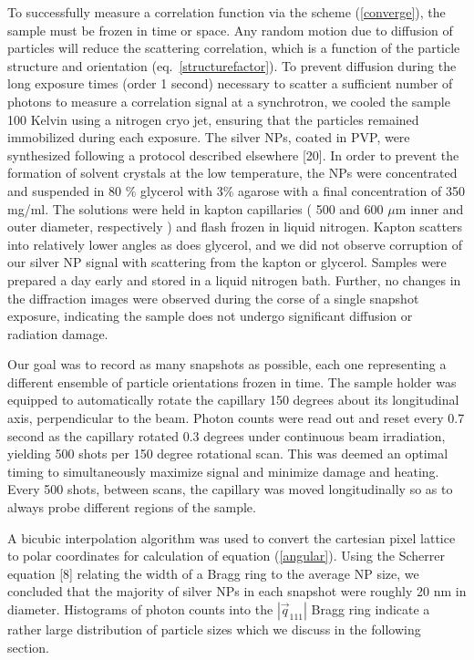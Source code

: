 \documentclass [11pt,fleqn]{article}
\begin{document}
To successfully measure a correlation function via the scheme (\ref{converge}), the sample must be frozen in time or space. Any random motion due to diffusion of particles will reduce the scattering correlation, which is a function of the particle structure and orientation (eq.~\ref{structurefactor}). To prevent diffusion during the long exposure times (order 1 second) necessary to scatter a sufficient number of photons to measure a correlation signal at a synchrotron, we cooled the sample 100 Kelvin using a nitrogen cryo jet, ensuring that the particles remained immobilized during each exposure. The silver NPs, coated in PVP, were synthesized following a protocol described elsewhere [20]. In order to prevent the formation of solvent crystals at the low temperature, the NPs were concentrated and suspended in 80 \% glycerol with 3\% agarose with a final concentration of 350 mg/ml. The solutions were held in kapton capillaries ( 500 and 600 $\mu$m inner and outer diameter, respectively ) and flash frozen in liquid nitrogen. Kapton scatters into relatively lower angles as does glycerol, and we did not observe corruption of our silver NP signal with scattering from the kapton or glycerol. Samples were prepared a day early and stored in a liquid nitrogen bath. Further, no changes in the diffraction images were observed during the corse of a single snapshot exposure, indicating the sample does not undergo significant diffusion or radiation damage.

Our goal was to record as many snapshots as possible, each one representing a different ensemble of particle orientations frozen in time. The sample holder was equipped to automatically rotate the capillary 150 degrees about its longitudinal axis, perpendicular to the beam. Photon counts were read out and reset every 0.7 second as the capillary rotated 0.3 degrees under continuous beam irradiation, yielding 500 shots per 150 degree rotational scan. This was deemed an optimal timing to simultaneously maximize signal and minimize damage and heating. Every 500 shots, between scans, the capillary was moved longitudinally so as to always probe different regions of the sample.

A bicubic interpolation algorithm was used to convert the cartesian pixel lattice to polar coordinates for calculation of equation (\ref{angular}). Using the Scherrer equation [8] relating the width of a Bragg ring to the average NP size, we concluded that the majority of silver NPs in each snapshot were roughly 20 nm in diameter. Histograms of photon counts into the $|\vec{q}_{111}|$ Bragg ring indicate a rather large distribution of particle sizes which we discuss in the following section.
\end{document}
